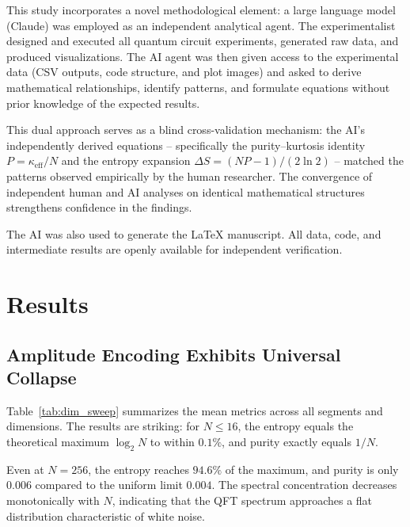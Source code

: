 \documentclass[conference]{IEEEtran}
\begin{document}
This study incorporates a novel methodological element: a large language model (Claude) was employed as an independent analytical agent. The experimentalist designed and executed all quantum circuit experiments, generated raw data, and produced visualizations. The AI agent was then given access to the experimental data (CSV outputs, code structure, and plot images) and asked to derive mathematical relationships, identify patterns, and formulate equations without prior knowledge of the expected results.

This dual approach serves as a blind cross-validation mechanism: the AI's independently derived equations -- specifically the purity--kurtosis identity $P = \kappa_{\text{eff}}/N$ and the entropy expansion $\Delta S = (NP-1)/(2\ln 2)$ -- matched the patterns observed empirically by the human researcher. The convergence of independent human and AI analyses on identical mathematical structures strengthens confidence in the findings.

The AI was also used to generate the LaTeX manuscript. All data, code, and intermediate results are openly available for independent verification.

\section{Results}

\subsection{Amplitude Encoding Exhibits Universal Collapse}

Table~\ref{tab:dim_sweep} summarizes the mean metrics across all segments and dimensions. The results are striking: for $N \leq 16$, the entropy equals the theoretical maximum $\log_2 N$ to within $0.1\%$, and purity exactly equals $1/N$.

Even at $N = 256$, the entropy reaches $94.6\%$ of the maximum, and purity is only $0.006$ compared to the uniform limit $0.004$. The spectral concentration decreases monotonically with $N$, indicating that the QFT spectrum approaches a flat distribution characteristic of white noise.
\end{document}
